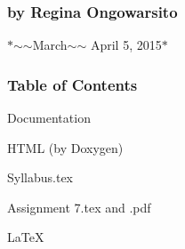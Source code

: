 \subsubsection*{by Regina Ongowarsito}

$\ast$$\sim$$\sim$\+March$\sim$$\sim$ April 5, 2015$\ast$

\subsubsection*{Table of Contents}


\begin{DoxyItemize}
\item Documentation
\item H\+T\+M\+L (by Doxygen)
\item Syllabus.\+tex
\item Assignment 7.\+tex and .pdf
\item La\+Te\+X 
\end{DoxyItemize}